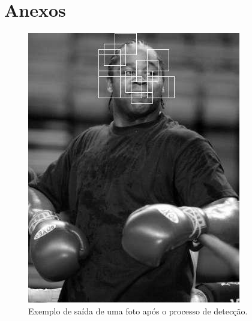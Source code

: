 \documentclass[aspectratio=169, xcolor=dvipsnames]{beamer}
\begin{document}
\section*{Anexos}
	\begin{frame}
		\begin{figure}[h]
			\centering
			\includegraphics[width=0.9\linewidth]{img/detect.jpg}
			\caption{Exemplo de saída de uma foto após o processo de detecção.}
			\label{fig:detect_}
		\end{figure}
	\end{frame}
	
\end{document}
